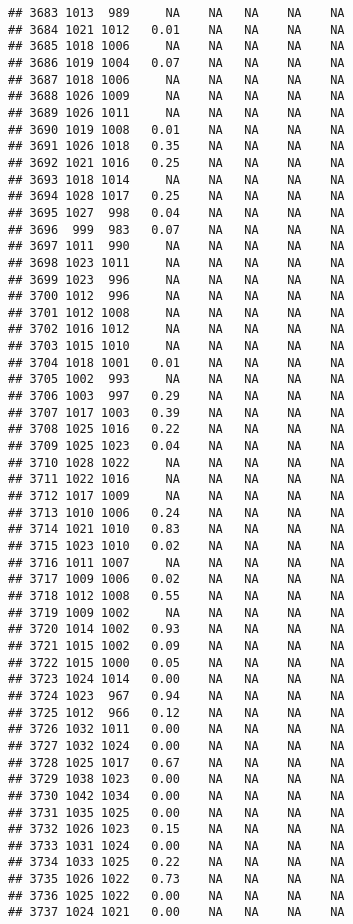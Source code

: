 \documentclass{article}\usepackage{graphicx, color}
\makeatletter
\newenvironment{kframe}{%
 \def\at@end@of@kframe{}%
 \ifinner\ifhmode%
  \def\at@end@of@kframe{\end{minipage}}%
  \begin{minipage}{\columnwidth}%
 \fi\fi%
 \def\FrameCommand##1{\hskip\@totalleftmargin \hskip-\fboxsep
 \colorbox{shadecolor}{##1}\hskip-\fboxsep
     \hskip-\linewidth \hskip-\@totalleftmargin \hskip\columnwidth}%
 \MakeFramed {\advance\hsize-\width
   \@totalleftmargin\z@ \linewidth\hsize
   \@setminipage}}%
 {\par\unskip\endMakeFramed%
 \at@end@of@kframe}
\newenvironment{knitrout}{}{} %
\makeatother
\begin{document}
\begin{knitrout}
\begin{kframe}
\begin{verbatim}
## 3683 1013  989     NA    NA   NA    NA    NA
## 3684 1021 1012   0.01    NA   NA    NA    NA
## 3685 1018 1006     NA    NA   NA    NA    NA
## 3686 1019 1004   0.07    NA   NA    NA    NA
## 3687 1018 1006     NA    NA   NA    NA    NA
## 3688 1026 1009     NA    NA   NA    NA    NA
## 3689 1026 1011     NA    NA   NA    NA    NA
## 3690 1019 1008   0.01    NA   NA    NA    NA
## 3691 1026 1018   0.35    NA   NA    NA    NA
## 3692 1021 1016   0.25    NA   NA    NA    NA
## 3693 1018 1014     NA    NA   NA    NA    NA
## 3694 1028 1017   0.25    NA   NA    NA    NA
## 3695 1027  998   0.04    NA   NA    NA    NA
## 3696  999  983   0.07    NA   NA    NA    NA
## 3697 1011  990     NA    NA   NA    NA    NA
## 3698 1023 1011     NA    NA   NA    NA    NA
## 3699 1023  996     NA    NA   NA    NA    NA
## 3700 1012  996     NA    NA   NA    NA    NA
## 3701 1012 1008     NA    NA   NA    NA    NA
## 3702 1016 1012     NA    NA   NA    NA    NA
## 3703 1015 1010     NA    NA   NA    NA    NA
## 3704 1018 1001   0.01    NA   NA    NA    NA
## 3705 1002  993     NA    NA   NA    NA    NA
## 3706 1003  997   0.29    NA   NA    NA    NA
## 3707 1017 1003   0.39    NA   NA    NA    NA
## 3708 1025 1016   0.22    NA   NA    NA    NA
## 3709 1025 1023   0.04    NA   NA    NA    NA
## 3710 1028 1022     NA    NA   NA    NA    NA
## 3711 1022 1016     NA    NA   NA    NA    NA
## 3712 1017 1009     NA    NA   NA    NA    NA
## 3713 1010 1006   0.24    NA   NA    NA    NA
## 3714 1021 1010   0.83    NA   NA    NA    NA
## 3715 1023 1010   0.02    NA   NA    NA    NA
## 3716 1011 1007     NA    NA   NA    NA    NA
## 3717 1009 1006   0.02    NA   NA    NA    NA
## 3718 1012 1008   0.55    NA   NA    NA    NA
## 3719 1009 1002     NA    NA   NA    NA    NA
## 3720 1014 1002   0.93    NA   NA    NA    NA
## 3721 1015 1002   0.09    NA   NA    NA    NA
## 3722 1015 1000   0.05    NA   NA    NA    NA
## 3723 1024 1014   0.00    NA   NA    NA    NA
## 3724 1023  967   0.94    NA   NA    NA    NA
## 3725 1012  966   0.12    NA   NA    NA    NA
## 3726 1032 1011   0.00    NA   NA    NA    NA
## 3727 1032 1024   0.00    NA   NA    NA    NA
## 3728 1025 1017   0.67    NA   NA    NA    NA
## 3729 1038 1023   0.00    NA   NA    NA    NA
## 3730 1042 1034   0.00    NA   NA    NA    NA
## 3731 1035 1025   0.00    NA   NA    NA    NA
## 3732 1026 1023   0.15    NA   NA    NA    NA
## 3733 1031 1024   0.00    NA   NA    NA    NA
## 3734 1033 1025   0.22    NA   NA    NA    NA
## 3735 1026 1022   0.73    NA   NA    NA    NA
## 3736 1025 1022   0.00    NA   NA    NA    NA
## 3737 1024 1021   0.00    NA   NA    NA    NA

\end{verbatim}
\end{kframe}
\end{knitrout}
\end{document}
